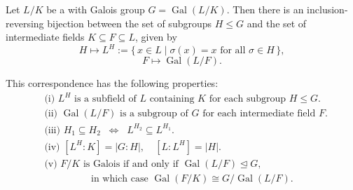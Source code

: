 \begin{theorem} \label{theorem:galois_correspondence_of_subextensions_of_finite_galois_field_extensions}
Let $L/K$ be a   with Galois group $G = \operatorname{Gal}(L/K)$. Then there is an inclusion-reversing bijection between the set of subgroups $H \leq G$ and the set of intermediate fields $K \subseteq F \subseteq L$, given by
$$ H \longmapsto L^H := \{\, x \in L \mid \sigma(x) = x \text{ for all } \sigma \in H \,\}, $$
$$ F \longmapsto \operatorname{Gal}(L/F). $$

This correspondence has the following properties:
\begin{align*}
&\text{(i) } L^H \text{ is a subfield of } L \text{ containing } K \text{ for each subgroup } H \leq G. \\
&\text{(ii) } \operatorname{Gal}(L/F) \text{ is a subgroup of } G \text{ for each intermediate field } F. \\
&\text{(iii) } H_1 \subseteq H_2 \;\;\Longleftrightarrow\;\; L^{H_2} \subseteq L^{H_1}. \\
&\text{(iv) } [L^H : K] = |G:H|, \quad [L: L^H] = |H|. \\
&\text{(v) } F/K \text{ is Galois if and only if } \operatorname{Gal}(L/F) \unlhd G, \\
&\hspace{2cm} \text{in which case } \operatorname{Gal}(F/K) \cong G / \operatorname{Gal}(L/F).
\end{align*}
\end{theorem}